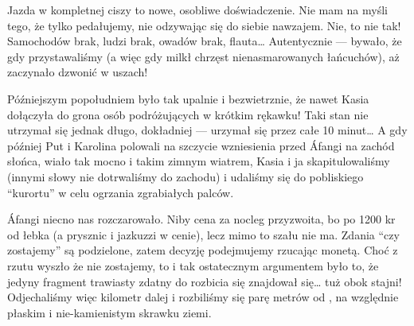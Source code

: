 
Jazda w kompletnej ciszy to nowe, osobliwe doświadczenie. Nie mam na myśli tego, że tylko pedałujemy, nie odzywając się do siebie nawzajem. Nie, to nie tak! Samochodów brak, ludzi brak, owadów brak, flauta… Autentycznie --- bywało, że gdy przystawaliśmy (a więc gdy milkł chrzęst nienasmarowanych łańcuchów), aż zaczynało dzwonić w uszach!

Późniejszym popołudniem było tak upalnie i bezwietrznie, że nawet Kasia dołączyła do grona osób podróżujących w krótkim rękawku! Taki stan nie utrzymał się jednak długo, dokładniej --- urzymał się przez całe 10 minut… A gdy później Put i Karolina polowali na szczycie wzniesienia przed Áfangi na zachód słońca, wiało tak mocno i takim zimnym wiatrem, Kasia i ja skapitulowaliśmy (innymi słowy nie dotrwaliśmy do zachodu) i udaliśmy się do pobliskiego “kurortu” w celu ogrzania zgrabiałych palców.

Áfangi niecno nas rozczarowało. Niby cena za nocleg przyzwoita, bo po 1200 kr od łebka (a prysznic i jazkuzzi w cenie), lecz mimo to szału nie ma. Zdania “czy zostajemy” są podzielone, zatem decyzję podejmujemy rzucając monetą. Choć z rzutu wyszło że nie zostajemy, to i tak ostatecznym argumentem było to, że jedyny fragment trawiasty zdatny do rozbicia się znajdował się… tuż obok stajni! Odjechaliśmy więc kilometr dalej i rozbiliśmy się parę metrów od , na względnie płaskim i nie-kamienistym skrawku ziemi.


